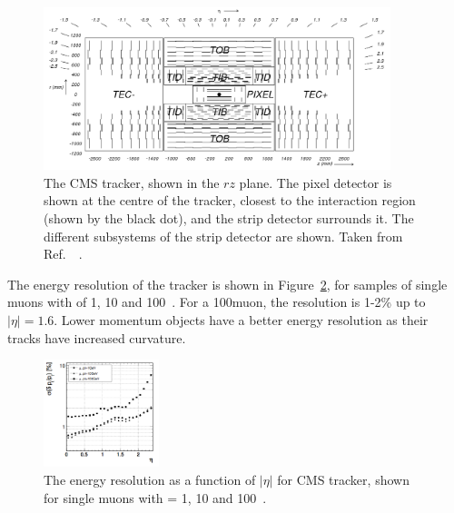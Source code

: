 \begin{figure}[htbp]
  \begin{center}
  \includegraphics[width=0.9\textwidth]{Figures/detector/fig_cmstracker}
  \caption{The \ac{CMS} tracker, shown in the $rz$ plane. The pixel detector is shown at the centre of the tracker, closest to the interaction region (shown by the black dot), and the strip detector surrounds it. The different subsystems of the strip detector are shown. Taken from Ref.~~\cite{Chatrchyan:2008aa}.
}
  \label{fig:CMStracker}
  \end{center}
\end{figure}


The energy resolution of the tracker is shown in Figure~\ref{fig:CMStrackerRes}, 
for samples of single muons with \pt of 1, 10 and 100~\GeV. 
For a 100\GeV muon, the resolution is 1-2\% up to $|\eta| = 1.6$. 
Lower momentum objects have a better energy resolution as their tracks have increased curvature.

\begin{figure}[htbp]
  \begin{center}
  \includegraphics[width=0.3\textwidth]{Figures/detector/cmstrackerRes}
  \caption{The energy resolution as a function of $|\eta|$ for \ac{CMS} tracker, shown for single muons with \pt = 1, 10 and 100~\GeV. 
}
  \label{fig:CMStrackerRes}
  \end{center}
\end{figure}


